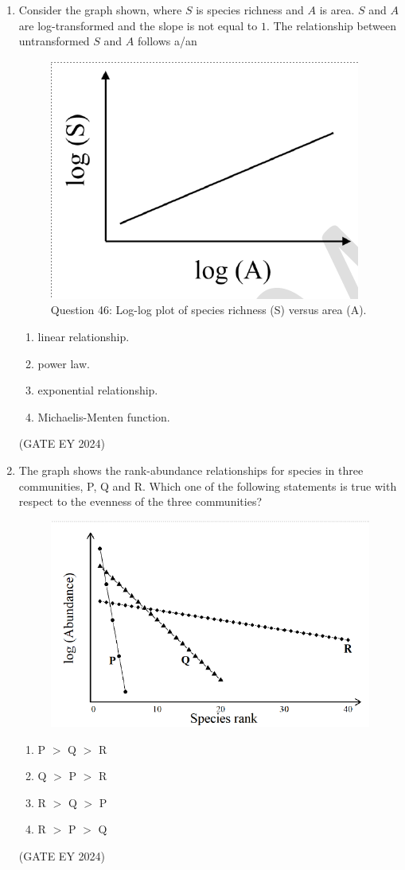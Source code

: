 \documentclass[journal]{IEEEtran}
\begin{document}
\begin{enumerate}
\item Consider the graph shown, where $S$ is species richness and $A$ is area. $S$ and $A$ are log-transformed and the slope is not equal to $1$. The relationship between untransformed $S$ and $A$ follows a/an
\begin{figure}[!ht]
    \centering
    \includegraphics[width=0.3\columnwidth]{figs/Q-46.png}
    \caption{Question 46: Log-log plot of species richness (S) versus area (A).}
    \label{Q.46}
\end{figure}
    \begin{enumerate}
        \item linear relationship.
        \item power law.
        \item exponential relationship.
        \item Michaelis-Menten function.
    \end{enumerate}
\hfill{(GATE EY 2024)}

\item The graph shows the rank-abundance relationships for species in three communities, P, Q and R. Which one of the following statements is true with respect to the evenness of the three communities?
\begin{figure}[!ht]
    \centering
    \includegraphics[width=0.8\columnwidth]{figs/Q-47.png}
    \label{Q.47}
\end{figure}
    \begin{enumerate}
        \item P $>$ Q $>$ R
        \item Q $>$ P $>$ R
        \item R $>$ Q $>$ P
        \item R $>$ P $>$ Q
    \end{enumerate}
\hfill{(GATE EY 2024)}


\end{enumerate}
\end{document}
